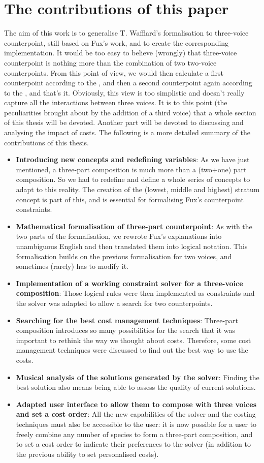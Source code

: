 \section{The contributions of this paper}
The aim of this work is to generalise T. Wafflard's formalisation to three-voice counterpoint, still based on Fux's work, and to create the corresponding implementation. It would be too easy to believe (wrongly) that three-voice counterpoint is nothing more than the combination of two two-voice counterpoints. From this point of view, we would then calculate a first counterpoint according to the \cf, and then a second counterpoint again according to the \cf, and that's it. Obviously, this view is too simplistic and doesn't really capture all the interactions between three voices. It is to this point (the peculiarities brought about by the addition of a third voice) that a whole section of this thesis will be devoted. Another part will be devoted to discussing and analysing the impact of costs. The following is a more detailed summary of the contributions of this thesis. 
\begin{itemize}
    \item \textbf{Introducing new concepts and redefining variables}:
    As we have just mentioned, a three-part composition is much more than a (two+one) part composition. So we had to redefine and define a whole series of concepts to adapt to this reality. The creation of the (lowest, middle and highest) stratum concept is part of this, and is essential for formalising Fux's counterpoint constraints.
    \item \textbf{Mathematical formalisation of three-part counterpoint}: As with the two parts of the formalisation, we rewrote Fux's explanations into unambiguous English and then translated them into logical notation. This formalisation builds on the previous formalisation for two voices, and sometimes (rarely) has to modify it.
    \item \textbf{Implementation of a working constraint solver for a three-voice composition}: Those logical rules were then implemented as constraints and the solver was adapted to allow a search for two counterpoints.
    \item \textbf{Searching for the best cost management techniques}: Three-part composition introduces so many possibilities for the search that it was important to rethink the way we thought about costs. Therefore, some cost management techniques were discussed to find out the best way to use the costs.
    \item \textbf{Musical analysis of the solutions generated by the solver}: Finding the best solution also means being able to assess the quality of current solutions.
    \item \textbf{Adapted user interface to allow them to compose with three voices and set a cost order}: All the new capabilities of the solver and the costing techniques must also be accessible to the user: it is now possible for a user to freely combine any number of species to form a three-part composition, and to set a cost order to indicate their preferences to the solver (in addition to the previous ability to set personalised costs).
\end{itemize}
